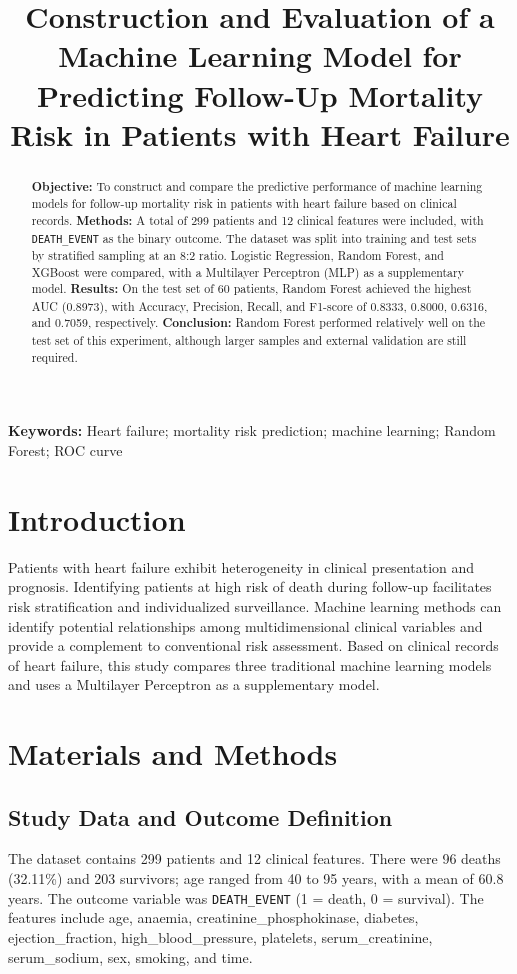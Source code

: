 \documentclass[a4paper,12pt]{article}
\title{Construction and Evaluation of a Machine Learning Model for Predicting Follow-Up Mortality Risk in Patients with Heart Failure}
\author{}
\date{}
\begin{document}
\maketitle

\begin{abstract}
\textbf{Objective:} To construct and compare the predictive performance of machine learning models for follow-up mortality risk in patients with heart failure based on clinical records. \textbf{Methods:} A total of 299 patients and 12 clinical features were included, with \texttt{DEATH\_EVENT} as the binary outcome. The dataset was split into training and test sets by stratified sampling at an 8:2 ratio. Logistic Regression, Random Forest, and XGBoost were compared, with a Multilayer Perceptron (MLP) as a supplementary model. \textbf{Results:} On the test set of 60 patients, Random Forest achieved the highest AUC (0.8973), with Accuracy, Precision, Recall, and F1-score of 0.8333, 0.8000, 0.6316, and 0.7059, respectively. \textbf{Conclusion:} Random Forest performed relatively well on the test set of this experiment, although larger samples and external validation are still required.
\end{abstract}
\noindent\textbf{Keywords:} Heart failure; mortality risk prediction; machine learning; Random Forest; ROC curve

\section{Introduction}
Patients with heart failure exhibit heterogeneity in clinical presentation and prognosis. Identifying patients at high risk of death during follow-up facilitates risk stratification and individualized surveillance. Machine learning methods can identify potential relationships among multidimensional clinical variables and provide a complement to conventional risk assessment. Based on clinical records of heart failure, this study compares three traditional machine learning models and uses a Multilayer Perceptron as a supplementary model.

\section{Materials and Methods}
\subsection{Study Data and Outcome Definition}
The dataset contains 299 patients and 12 clinical features. There were 96 deaths (32.11\%) and 203 survivors; age ranged from 40 to 95 years, with a mean of 60.8 years. The outcome variable was \texttt{DEATH\_EVENT} (1 = death, 0 = survival). The features include age, anaemia, creatinine\_phosphokinase, diabetes, ejection\_fraction, high\_blood\_pressure, platelets, serum\_creatinine, serum\_sodium, sex, smoking, and time.
\end{document}
